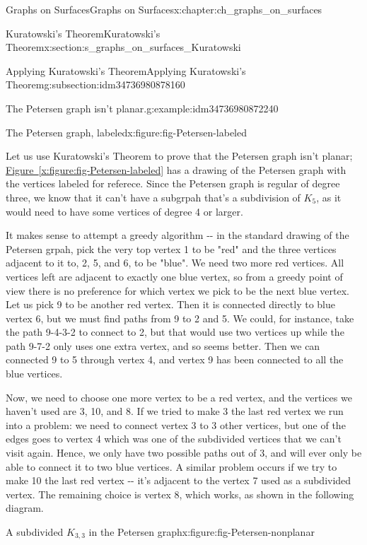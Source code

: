 \documentclass[oneside,10pt,]{book}
\newcommand{\xreffont}{\relax}
\numberwithin{equation}{section}
\begin{document}
\begin{chapterptx}{Graphs on Surfaces}{}{Graphs on Surfaces}{}{}{x:chapter:ch_graphs_on_surfaces}
\begin{sectionptx}{Kuratowski's Theorem}{}{Kuratowski's Theorem}{}{}{x:section:s_graphs_on_surfaces_Kuratowski}
\begin{subsectionptx}{Applying Kuratowski's Theorem}{}{Applying Kuratowski's Theorem}{}{}{g:subsection:idm34736980878160}
\begin{example}{The Petersen graph isn't planar.}{g:example:idm34736980872240}
\begin{figureptx}{The Petersen graph, labeled}{x:figure:fig-Petersen-labeled}{}
\begin{image}{0.05}{0.9}{0.05}
{\begin{tikzpicture}
\end{tikzpicture}
}%
\end{image}%
\tcblower
\end{figureptx}%
Let us use Kuratowski's Theorem to prove that the Petersen graph isn't planar; \hyperref[x:figure:fig-Petersen-labeled]{Figure~{\xreffont\ref{x:figure:fig-Petersen-labeled}}} has a drawing of the Petersen graph with the vertices labeled for referece.  Since the Petersen graph is regular of degree three, we know that it can't have a subgrpah that's a subdivision of \(K_5\), as it would need to have some vertices of degree 4 or larger.%
\par
It makes sense to attempt a greedy algorithm -{}-{} in the standard drawing of the Petersen grpah, pick the very top vertex 1 to be "red" and the three vertices adjacent to it to, 2, 5, and 6, to be "blue".  We need two more red vertices.  All vertices left are adjacent to exactly one blue vertex, so from a greedy point of view there is no preference for which vertex we pick to be the next blue vertex.  Let us pick 9 to be another red vertex.  Then it is connected directly to blue vertex 6, but we must find paths from 9 to 2 and 5.  We could, for instance, take the path 9-4-3-2 to connect to 2, but that would use two vertices up while the path 9-7-2 only uses one extra vertex, and so seems better.  Then we can connected 9 to 5 through vertex 4, and vertex 9 has been connected to all the blue vertices.%
\par
Now, we need to choose one more vertex to be a red vertex, and the vertices we haven't used are 3, 10, and 8.  If we tried to make 3 the last red vertex we run into a problem: we need to connect vertex 3 to 3 other vertices, but one of the edges goes to vertex 4 which was one of the subdivided vertices that we can't visit again.  Hence, we only have two possible paths out of 3, and will ever only be able to connect it to two blue vertices.  A similar problem occurs if we try to make 10 the last red vertex -{}-{} it's adjacent to the vertex 7 used as a subdivided vertex.  The remaining choice is vertex 8, which works, as shown in the following diagram.%
\begin{figureptx}{A subdivided \(K_{3,3}\) in the Petersen graph}{x:figure:fig-Petersen-nonplanar}{}%
\begin{image}{0.05}{0.9}{0.05}%
\resizebox{\linewidth}{!}{%
\begin{tikzpicture}


\end{tikzpicture}}
\end{image}
\end{figureptx}
\end{example}
\end{subsectionptx}
\end{sectionptx}
\end{chapterptx}
\end{document}
